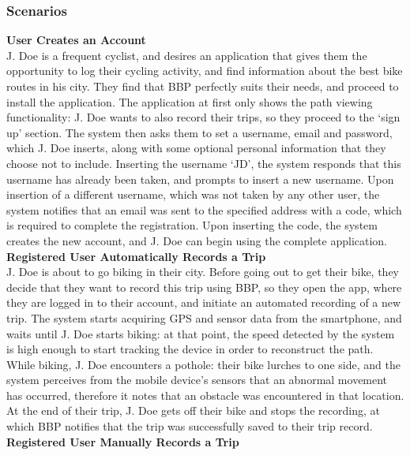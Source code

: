 \subsubsection{Scenarios}

\textbf{User Creates an Account}\\
J. Doe is a frequent cyclist, and desires an application that gives them the opportunity to log their cycling 
activity, and find information about the best bike routes in his city. They find that BBP perfectly 
suits their needs, and proceed to install the application. The application at first only shows the 
path viewing functionality: J. Doe wants to also record their trips, so they proceed to the ‘sign up’ 
section. The system then asks them to set a username, email and password, which J. Doe inserts, along 
with some optional personal information that they choose not to include. Inserting the username ‘JD’, 
the system responds that this username has already been taken, and prompts to insert a new username. 
Upon insertion of a different username, which was not taken by any other user, the system notifies 
that an email was sent to the specified address with a code, which is required to complete the 
registration. Upon inserting the code, the system creates the new account, and J. Doe can begin 
using the complete application. \\
\newline
\textbf{Registered User Automatically Records a Trip}\\
J. Doe is about to go biking in their city. Before going out to get their bike, they decide that they 
want to record this trip using BBP, so they open the app, where they are logged in to their account, 
and initiate an automated recording of a new trip. The system starts acquiring GPS and sensor data 
from the smartphone, and waits until J. Doe starts biking: at that point, the speed detected by the 
system is high enough to start tracking the device in order to reconstruct the path. While biking, 
J. Doe encounters a pothole: their bike lurches to one side, and the system perceives from the mobile 
device’s sensors that an abnormal movement has occurred, therefore it notes that an obstacle was 
encountered in that location. At the end of their trip, J. Doe gets off their bike and stops the 
recording, at which BBP notifies that the trip was successfully saved to their trip record. \\
\newline
\textbf{Registered User Manually Records a Trip}\\
